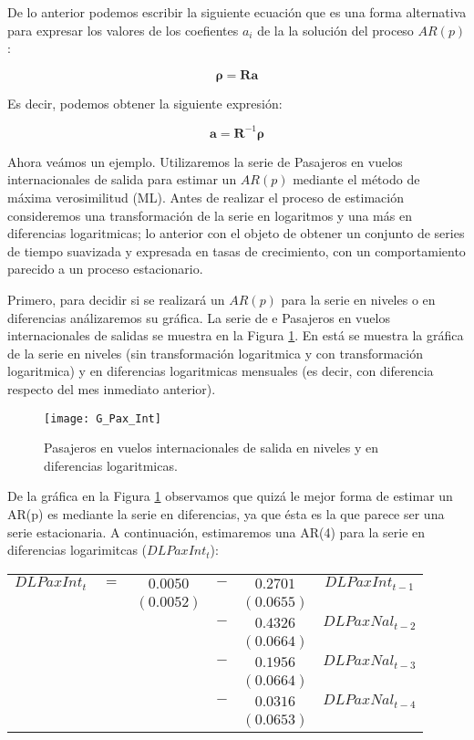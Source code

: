 \documentclass[
  a4paper,
]{article}
\begin{document}
De lo anterior podemos escribir la siguiente ecuación que es una forma
alternativa para expresar los valores de los coefientes \(a_i\) de la la
solución del proceso \(AR(p)\):

\[
\mathbf{\rho} = \mathbf{R} \mathbf{a}
\]

Es decir, podemos obtener la siguiente expresión:

\[
\mathbf{a} = \mathbf{R}^{-1} \mathbf{\rho}
\]

Ahora veámos un ejemplo. Utilizaremos la serie de Pasajeros en vuelos
internacionales de salida para estimar un \(AR(p)\) mediante el método
de máxima verosimilitud (ML). Antes de realizar el proceso de estimación
consideremos una transformación de la serie en logaritmos y una más en
diferencias logaritmicas; lo anterior con el objeto de obtener un
conjunto de series de tiempo suavizada y expresada en tasas de
crecimiento, con un comportamiento parecido a un proceso estacionario.

Primero, para decidir si se realizará un \(AR(p)\) para la serie en
niveles o en diferencias análizaremos su gráfica. La serie de e
Pasajeros en vuelos internacionales de salidas se muestra en la Figura
\ref{G_Pax_Int}. En está se muestra la gráfica de la serie en niveles
(sin transformación logaritmica y con transformación logaritmica) y en
diferencias logaritmicas mensuales (es decir, con diferencia respecto
del mes inmediato anterior).

\begin{figure}
  \centering
    \texttt{[image: G\_Pax\_Int]}
  \caption{Pasajeros en vuelos internacionales de salida en niveles y en diferencias logaritmicas.}
  \label{G_Pax_Int}
\end{figure}

De la gráfica en la Figura \ref{G_Pax_Int} observamos que quizá le mejor
forma de estimar un AR(p) es mediante la serie en diferencias, ya que
ésta es la que parece ser una serie estacionaria. A continuación,
estimaremos una AR(4) para la serie en diferencias logarimitcas
(\(DLPaxInt_t\)):

\begin{center}
\begin{tabular}{ c c c c c c } 
    $DLPaxInt_t$ & $=$ & $0.0050$ & $-$ & $0.2701$  & $DLPaxInt_{t-1}$ \\ 
    &  & $(0.0052)$ &  & $(0.0655)$ & \\
    &  &  & $-$ & $0.4326$ & $DLPaxNal_{t-2}$ \\
    &  &  &  & $(0.0664)$ & \\
    &  &  & $-$ & $0.1956$ & $DLPaxNal_{t-3}$ \\
    &  &  &  & $(0.0664)$ & \\
    &  &  & $-$ & $0.0316$ & $DLPaxNal_{t-4}$ \\
    &  &  &  & $(0.0653)$ & 
\end{tabular}
\end{center}
\end{document}

